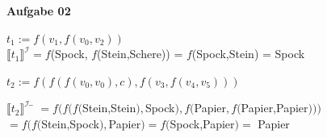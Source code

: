 \documentclass[a4paper,10pt]{article}
\begin{document}
	\textbf{Aufgabe 02}\\
	\begin{compactitem}
		\item $ t_1 := f(v_1,f(v_0,v_2)) $\\
		
		$ \llbracket t_1\rrbracket^\mathcal{I} =  f$(Spock, $f$(Stein,Schere)) = $f$(Spock,Stein) = Spock \\
		
		\item $ t_2 := f(f(f(v_0,v_0),c),f(v_3,f(v_4,v_5))) $\\
		\begin{tabbing}
			$ \llbracket t_2\rrbracket^\mathcal{I}$
			\= $ = f(f(f($Stein,Stein$),$Spock$),f($Papier$, f($Papier,Papier$)))$ \\
			\> $= f(f($Stein,Spock$),$Papier$) = f($Spock,Papier$) = $ Papier 
		\end{tabbing}
	\end{compactitem} \
		
\end{document}

